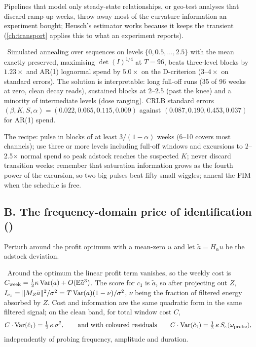 Pipelines that model only steady-state relationships, or geo-test analyses that discard ramp-up weeks, throw away most of the curvature information an experiment bought; Heusch's estimator works because it keeps the transient (\cref{ch:transport} applies this to what an experiment reports).

\begin{construction}
\label{ident:con:anneal}
\tagNumerical\ Simulated annealing over sequences on levels $\{0, 0.5, \ldots, 2.5\}$ with the mean exactly preserved, maximising $\det(I)^{1/4}$ at $T = 96$, beats three-level blocks by $1.23\times$ and AR(1) lognormal spend by $5.0\times$ on the D-criterion ($3$--$4\times$ on standard errors). The solution is interpretable: long full-off runs (35 of 96 weeks at zero, clean decay reads), sustained blocks at 2--2.5 (past the knee) and a minority of intermediate levels (dose ranging). CRLB standard errors $(\beta, K, S, \alpha) = (0.022, 0.065, 0.115, 0.009)$ against $(0.087, 0.190, 0.453, 0.037)$ for AR(1) spend.
\end{construction}

The recipe: pulse in blocks of at least $3/(1-\alpha)$ weeks (6--10 covers most channels); use three or more levels including full-off windows and excursions to 2--2.5$\times$ normal spend so peak adstock reaches the suspected $K$; never discard transition weeks; remember that saturation information grows as the fourth power of the excursion, so two big pulses beat fifty small wiggles; anneal the FIM when the schedule is free.

\subsection{B. The frequency-domain price of identification ()}

Perturb around the profit optimum with a mean-zero $u$ and let $\tilde a = H_\alpha u$ be the adstock deviation.

\begin{theorem}
\label{ident:thm:hyperbola}
\tagEstablished\ Around the optimum the linear profit term vanishes, so the weekly cost is $C_{\rm week} = \tfrac12\kappa\operatorname{Var}(a) + O(\mathbb{E}\tilde a^3)$. The score for $c_1$ is $\tilde a$, so after projecting out $Z$, $I_{c_1} = \|M_Z\tilde a\|^2/\sigma^2 = T\operatorname{Var}(a)(1-\nu)/\sigma^2$, $\nu$ being the fraction of filtered energy absorbed by $Z$. Cost and information are the same quadratic form in the same filtered signal; on the clean band, for total window cost $C$,
\begin{equation}
C\cdot\operatorname{Var}(\hat c_1) = \tfrac12\,\kappa\,\sigma^2, \qquad\text{and with coloured residuals}\qquad C\cdot\operatorname{Var}(\hat c_1) = \tfrac12\,\kappa\,S_\varepsilon(\omega_{\rm probe}),
\label{ident:eq:hyperbola}
\end{equation}
independently of probing frequency, amplitude and duration.
\end{theorem}

